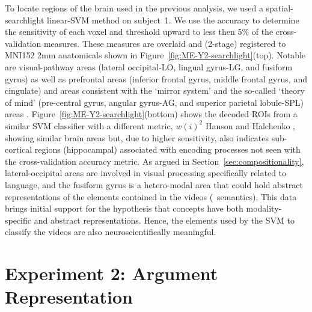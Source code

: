 To locate regions of the brain used in the previous analysis, we used a
spatial-searchlight linear-SVM method on subject~1.
%
We use the accuracy to determine the sensitivity of each voxel and threshold
upward to less then 5\% of the cross-validation measures.
%
These measures are overlaid and (2-stage) registered to MNI152 2mm
anatomicals shown in Figure~\ref{fig:ME-Y2-searchlight}(top).
%
Notable are visual-pathway areas (lateral occipital-LO, lingual gyrus-LG, and
fusiform gyrus) as well as prefrontal areas (inferior frontal gyrus, middle
frontal gyrus, and cingulate) and areas consistent with the `mirror system'
\citep{arbib2006action} and the so-called `theory of mind' (pre-central gyrus,
angular gyrus-AG, and superior parietal lobule-SPL) areas
\citep{dronkers2004lesion,turken2011neural}.
%
Figure~\ref{fig:ME-Y2-searchlight}(bottom) shows the decoded ROIs from
a similar SVM classifier with a different metric, $w(i)^2$ Hanson and
Halchenko \cite{hanson2009}, showing similar brain areas but, due to
higher sensitivity, also indicates sub-cortical regions (hippocampal)
associated with encoding processes not seen with the cross-validation
accuracy metric.
%
As argued in Section~\ref{sec:compositionality}, lateral-occipital areas are
involved in visual processing specifically related to language, and the
fusiform gyrus is a hetero-modal area that could hold abstract representations
of the elements contained in the videos (\eg\ semantics).
%
This data brings initial support for the hypothesis that concepts have both
modality-specific and abstract representations.
%
Hence, the elements used by the SVM to classify the videos are also
neuroscientifically meaningful.

\section{Experiment 2: Argument Representation}
\label{sec:experiment2}

